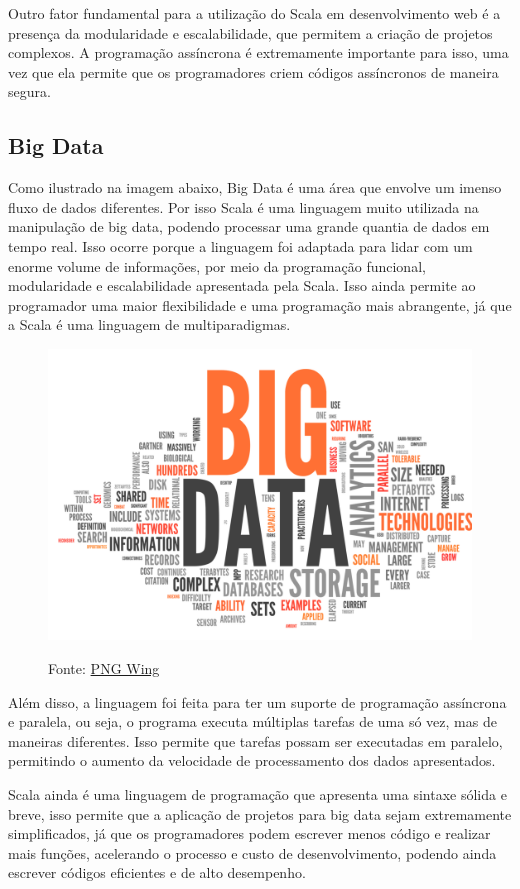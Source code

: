 		Outro fator fundamental para a utilização do Scala em desenvolvimento web é a presença da modularidade e escalabilidade, que permitem a criação de projetos complexos. A programação assíncrona é extremamente importante para isso, uma vez que ela permite que os programadores criem códigos assíncronos de maneira segura.
		
		 \subsection{Big Data}
		 Como ilustrado na imagem abaixo, Big Data é uma área que envolve um imenso fluxo de dados diferentes. Por isso Scala é uma linguagem muito utilizada na manipulação de big data, podendo processar uma grande quantia de dados em tempo real. Isso ocorre porque a linguagem foi adaptada para lidar com um enorme volume de informações, por meio da programação funcional, modularidade e escalabilidade apresentada pela Scala. Isso ainda permite ao programador uma maior flexibilidade e uma programação mais abrangente, já que a Scala é uma linguagem de multiparadigmas. 
		 
		\begin{figure}[H]
			\centering
			\includegraphics[width=0.7\linewidth]{Pictures/BigData}
			\caption{}
			\label{fig:bigdata}
			Fonte: \href{https://www.pngwing.com/pt}{PNG Wing}
		\end{figure}
		
		Além disso, a linguagem foi feita para ter um suporte de programação assíncrona e paralela, ou seja, o programa executa múltiplas tarefas de uma só vez, mas de maneiras diferentes. Isso permite que tarefas possam ser executadas em paralelo, permitindo o aumento da velocidade de processamento dos dados apresentados. 
		
		Scala ainda é uma linguagem de programação que apresenta uma sintaxe sólida e breve, isso permite que a aplicação de projetos para big data sejam extremamente simplificados, já que os programadores podem escrever menos código e realizar mais funções, acelerando o processo e custo de desenvolvimento, podendo ainda escrever códigos eficientes e de alto desempenho. 
		
